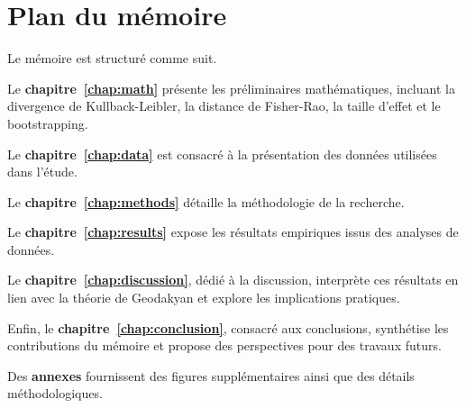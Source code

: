 \section{Plan du mémoire}

Le mémoire est structuré comme suit.

Le \textbf{chapitre~\ref{chap:math}} présente les préliminaires mathématiques, incluant la divergence de Kullback-Leibler, la distance de Fisher-Rao, la taille d'effet et le bootstrapping.

Le \textbf{chapitre~\ref{chap:data}} est consacré à la présentation des données utilisées dans l’étude.

Le \textbf{chapitre~\ref{chap:methods}} détaille la méthodologie de la recherche.

Le \textbf{chapitre~\ref{chap:results}} expose les résultats empiriques issus des analyses de données.

Le \textbf{chapitre~\ref{chap:discussion}}, dédié à la discussion, interprète ces résultats en lien avec la théorie de Geodakyan et explore les implications pratiques.

Enfin, le \textbf{chapitre~\ref{chap:conclusion}}, consacré aux conclusions, synthétise les contributions du mémoire et propose des perspectives pour des travaux futurs.

Des \textbf{annexes} fournissent des figures supplémentaires ainsi que des détails méthodologiques.